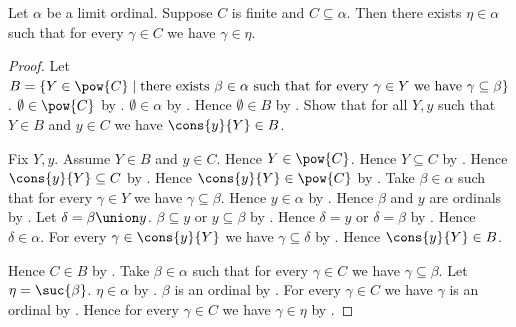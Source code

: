 \begin{lemma}\label{finite_subset_of_limit_has_strict_upper_bound}
    Let $\alpha$ be a limit ordinal.
    Suppose $C$ is finite and $C\subseteq\alpha$.
    Then there exists $\eta\in\alpha$ such that
        for every $\gamma\in C$ we have $\gamma\in\eta$.
\end{lemma}
\begin{proof}
    Let $B=\{Y\in\pow{C}\mid
        \text{there exists $\beta\in\alpha$ such that
        for every $\gamma\in Y$ we have $\gamma\subseteq\beta$}\}$.
    $\emptyset\in\pow{C}$ by .
    $\emptyset\in\alpha$ by .
    Hence $\emptyset\in B$ by .
    Show that for all $Y,y$ such that $Y\in B$ and $y\in C$ we have
        $\cons{y}{Y}\in B$.
    \begin{subproof}
        Fix $Y,y$.
        Assume $Y\in B$ and $y\in C$.
        Hence $Y\in\pow{C}$.
        Hence $Y\subseteq C$ by .
        Hence $\cons{y}{Y}\subseteq C$
            by .
        Hence $\cons{y}{Y}\in\pow{C}$ by .
        Take $\beta\in\alpha$ such that
            for every $\gamma\in Y$ we have $\gamma\subseteq\beta$.
        Hence $y\in\alpha$ by .
        Hence $\beta$ and $y$ are ordinals
            by .
        Let $\delta=\beta\union y$.
        $\beta\subseteq y$ or $y\subseteq\beta$
            by .
        Hence $\delta=y$ or $\delta=\beta$
            by .
        Hence $\delta\in\alpha$.
        For every $\gamma\in\cons{y}{Y}$ we have
            $\gamma\subseteq\delta$
            by .
        Hence $\cons{y}{Y}\in B$.
    \end{subproof}
    Hence $C\in B$ by .
    Take $\beta\in\alpha$ such that
        for every $\gamma\in C$ we have $\gamma\subseteq\beta$.
    Let $\eta=\suc{\beta}$.
    $\eta\in\alpha$ by .
    $\beta$ is an ordinal
        by .
    For every $\gamma\in C$ we have $\gamma$ is an ordinal
        by .
    Hence for every $\gamma\in C$ we have
        $\gamma\in\eta$
        by .
\end{proof}

